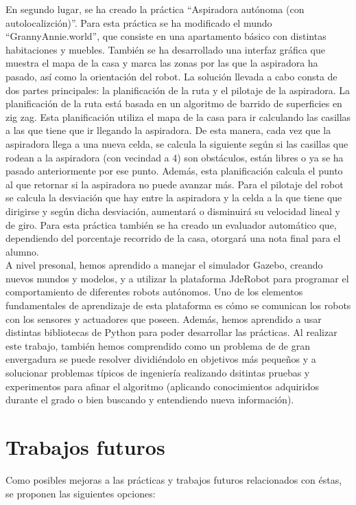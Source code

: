 En segundo lugar, se ha creado la práctica ``Aspiradora autónoma (con autolocalizción)''. Para esta práctica se ha modificado el mundo ``GrannyAnnie.world'', que consiste en una apartamento básico con distintas habitaciones y muebles. También se ha desarrollado una interfaz gráfica que muestra el mapa de la casa y marca las zonas por las que la aspiradora ha pasado, así como la orientación del robot. La solución llevada a cabo consta de dos partes principales: la planificación de la ruta y el pilotaje de la aspiradora. La planificación de la ruta está basada en un algoritmo de barrido de superficies en zig zag. Esta planificación utiliza el mapa de la casa para ir calculando las casillas a las que tiene que ir llegando la aspiradora. De esta manera, cada vez que la aspiradora llega a una nueva celda, se calcula la siguiente según si las casillas que rodean a la aspiradora (con vecindad a 4) son obstáculos, están libres o ya se ha pasado anteriormente por ese punto. Además, esta planificación calcula el punto al que retornar si la aspiradora no puede avanzar más. Para el pilotaje del robot se calcula la desviación que hay entre la aspiradora y la celda a la que tiene que dirigirse y según dicha desviación, aumentará o disminuirá su velocidad lineal y de giro. Para esta práctica también se ha creado un evaluador automático que, dependiendo del porcentaje recorrido de la casa, otorgará una nota final para el alumno.\\

A nivel presonal, hemos aprendido a manejar el simulador Gazebo, creando nuevos mundos y modelos, y a utilizar la plataforma JdeRobot para programar el comportamiento de diferentes robots autónomos. Uno de los elementos fundamentales de aprendizaje de esta plataforma es cómo se comunican los robots con los sensores y actuadores que poseen. Además, hemos aprendido a usar distintas bibliotecas de Python para poder desarrollar las prácticas. Al realizar este trabajo, también hemos comprendido como un problema de de gran envergadura se puede resolver dividiéndolo en objetivos más pequeños y a solucionar problemas típicos de ingeniería realizando dsitintas pruebas y experimentos para afinar el algoritmo (aplicando conocimientos adquiridos durante el grado o bien buscando y entendiendo nueva información).


\section{Trabajos futuros}
Como posibles mejoras a las prácticas y trabajos futuros relacionados con éstas, se proponen las siguientes opciones:

